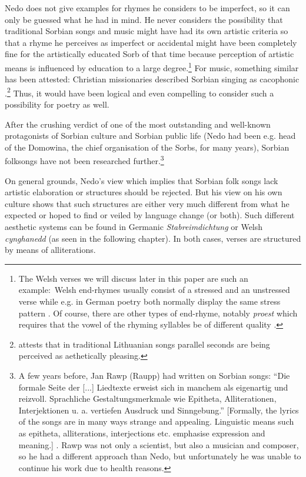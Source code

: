 \documentclass[output=paper,hidelinks]{langscibook}
\begin{document}
 
Nedo does not give examples for rhymes he considers to be imperfect, so it can only be guessed what he had in mind. He never considers the possibility that traditional Sorbian songs and music might have had its own artistic criteria so that a rhyme he perceives as imperfect or accidental might have been completely fine for the artistically educated Sorb of that time because perception of artistic means is influenced by education to a large degree.\footnote{The Welsh verses we will discuss later in this paper are such an example:~Welsh end-rhymes usually consist of a stressed and an unstressed verse while e.g. in German poetry both \textrm{normally} display the same stress pattern \citep[40f]{Kayser1954}. Of course, there are other types of end-rhyme, notably \textit{proest} which requires that the vowel of the rhyming syllables be of different quality \citep[149ff]{Llwyd2007}.} For music, something similar has been attested: Christian missionaries described Sorbian singing as cacophonic \citep[11]{Rawp1978}.\footnote{\citet[22]{Slaviunas1958} attests that in traditional Lithuanian songs parallel seconds are being perceived as aethetically pleasing.} Thus, it would have been logical and even compelling to consider such a possibility for poetry as well.
 

 
After the crushing verdict of one of the most outstanding and well-known protagonists of Sorbian culture and Sorbian public life (Nedo had been e.g. head of the Domowina, the chief organisation of the Sorbs, for many years), Sorbian folksongs have not been researched further.\footnote{A few years before, Jan Rawp (Raupp) had written on Sorbian songs: “Die formale Seite der [...] Liedtexte erweist sich in manchem als eigenartig und reizvoll. Sprachliche Gestaltungsmerkmale wie Epitheta, Alliterationen, Interjektionen u. a. vertiefen Ausdruck und Sinngebung.” [Formally, the lyrics of the songs are in many ways strange and appealing. Linguistic means such as epitheta, alliterations, interjections etc. emphasise expression and meaning.] \citep[10]{Raupp1966}. Rawp was not only a scientist, but also a musician and composer, so he had a different approach than Nedo, but unfortunately he was unable to continue his work due to health reasons.}
 

 
On general grounds, Nedo’s view which implies that Sorbian folk songs lack artistic elaboration or structures should be rejected. But his view on his own culture shows that such structures are either very much different from what he expected or hoped to find or veiled by language change (or both). Such different aesthetic systems can be found in Germanic \textit{Stabreimdichtung} or Welsh \textit{cynghanedd} (as seen in the following chapter). In both cases, verses are structured by means of alliterations.
 
\end{document}
